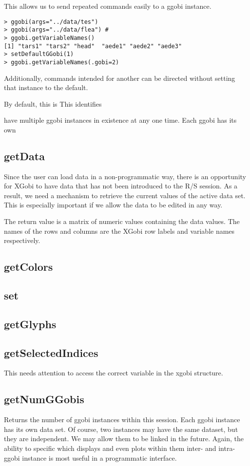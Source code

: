 \documentclass{article}
\begin{document}
This allows us to send repeated commands easily to a ggobi instance.
\begin{verbatim}
> ggobi(args="../data/tes") 
> ggobi(args="../data/flea") #
> ggobi.getVariableNames()
[1] "tars1" "tars2" "head"  "aede1" "aede2" "aede3"
> setDefaultGGobi(1)
> ggobi.getVariableNames(.gobi=2)
\end{verbatim}
Additionally, commands intended for another can be directed without
setting that instance to the default.

By default, this is 
This identifies 


have multiple ggobi
instances in existence at any one time.
Each ggobi has its own


\subsection{getData}
Since the user can load data in a non-programmatic way, there is an
opportunity for XGobi to have data that has not been introduced to the
R/S session.  As a result, we need a mechanism to retrieve the current
values of the active data set.  This is especially important if we
allow the data to be edited in any way.

The return value is a matrix of numeric values containing the data
values.  The names of the rows and columns are the XGobi row labels
and variable names respectively.



\subsection{getColors}


\subsection{set}

\subsection{getGlyphs}


\subsection{getSelectedIndices}
This needs attention to access the correct
variable in the xgobi structure.


\subsection{getNumGGobis}
Returns the number of ggobi instances within this session.  Each ggobi
instance has its own data set. Of course, two instances may have the
same dataset, but they are independent.  We may allow them to be
linked in the future.  Again, the ability to specific which displays
and even plots within them inter- and intra- ggobi instance is most
useful in a programmatic interface.
\end{document}
